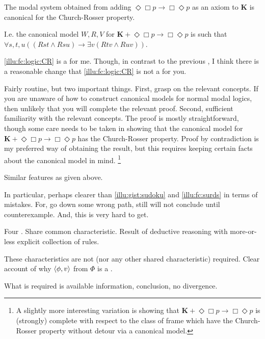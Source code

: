 \begin{note}
  \begin{illustration}
    \label{illu:fc:logic:CR}
    The modal system obtained from adding \(\Diamond\Box p \rightarrow \Box\Diamond p\) as an axiom to \(\mathbf{K}\) is canonical for the Church-Rosser property.

    I.e. the canonical model \(W,R,V\) for \(\mathbf{K} + \Diamond\Box p \rightarrow \Box\Diamond p\) is such that \(\forall s,t,u((Rst \land Rsu) \rightarrow \exists v(Rtv \land Ruv))\).
  \end{illustration}

  \autoref{illu:fc:logic:CR} is a \fc{} for me.
  Though, in contrast to the previous , I think there is a reasonable change that \autoref{illu:fc:logic:CR} is not a \fc{} for you.

  Fairly routine, but two important things.
  First, grasp on the relevant concepts.
  If you are unaware of how to construct canonical models for normal modal logics, then unlikely that you will complete the relevant proof.
  Second, sufficient familiarity with the relevant concepts.
  The proof is mostly straightforward, though some care needs to be taken in showing that the canonical model for \(\mathbf{K} + \Diamond\Box p \rightarrow \Box\Diamond p\) has the Church-Rosser property.
  Proof by contradiction is my preferred way of obtaining the result, but this requires keeping certain facts about the canonical model in mind.%
  \footnote{
    A slightly more interesting variation is showing that \(\mathbf{K} + \Diamond\Box p \rightarrow \Box\Diamond p\) is (strongly) complete with respect to the class of frame which have the Church-Rosser property without detour via a canonical model.
  }

  Similar features as  given above.

  In particular, perhaps clearer than \autoref{illu:gist:sudoku} and \autoref{illu:fc:surds} in terms of mistakes.
  For, go down some wrong path, still will not conclude until counterexample.
  And, this is very hard to get.
\end{note}

\begin{note}
  Four \illu{}.
  Share common characteristic.
  Result of deductive reasoning with more-or-less explicit collection of rules.

  These characteristics are not (nor any other shared characteristic) required.
  Clear account of why \(\langle \phi, v \rangle\) from \(\Phi\) is a \fc{}.

  What is required is available information, conclusion, no divergence.
\end{note}

